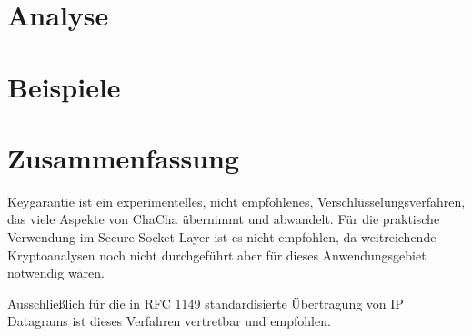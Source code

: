 \documentclass[10pt,a4paper]{article}
\begin{document}
\section{Analyse}

\section{Beispiele}

\section{Zusammenfassung}

Keygarantie ist ein experimentelles, nicht empfohlenes, Verschlüsselungsverfahren, das viele Aspekte von ChaCha übernimmt und abwandelt.
Für die praktische Verwendung im Secure Socket Layer ist es nicht empfohlen, da weitreichende Kryptoanalysen noch nicht durchgeführt aber für dieses Anwendungsgebiet notwendig wären.

Ausschließlich für die in RFC 1149 standardisierte Übertragung von IP Datagrams\cite{Waitzman1990} ist dieses Verfahren vertretbar und empfohlen.

{}

\end{document}
